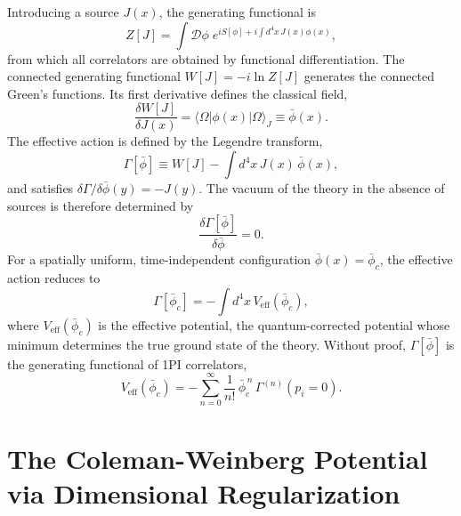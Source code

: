 Introducing a source $J(x)$, the generating functional is
\begin{equation}
	Z[J] = \int\mathcal{D}\phi\;
	e^{iS[\phi] + i\int d^4x\,J(x)\phi(x)},
\end{equation}
from which all correlators are obtained by functional differentiation.
The connected generating functional $W[J] = -i\ln Z[J]$ generates the
connected Green's functions. Its first derivative defines the classical
field,
\begin{equation}
	\frac{\delta W[J]}{\delta J(x)}
	= \langle\Omega|\phi(x)|\Omega\rangle_J
	\equiv \bar\phi(x).
\end{equation}
The effective action is defined by the Legendre transform,
\begin{equation}
	\Gamma[\bar\phi] \equiv W[J]
	- \int d^4x\,J(x)\,\bar\phi(x),
\end{equation}
and satisfies $\delta\Gamma/\delta\bar\phi(y) = -J(y)$. The vacuum of
the theory in the absence of sources is therefore determined by
\begin{equation}
	\frac{\delta\Gamma[\bar\phi]}{\delta\bar\phi} = 0.
\end{equation}
For a spatially uniform, time-independent configuration
$\bar\phi(x) = \bar\phi_c$, the effective action reduces to
\begin{equation}
	\Gamma[\bar\phi_c] = -\int d^4x\,V_{\text{eff}}(\bar\phi_c),
\end{equation}
where $V_{\text{eff}}(\bar\phi_c)$ is the effective potential, the
quantum-corrected potential whose minimum determines the true ground
state of the theory. Without proof, $\Gamma[\bar\phi]$ is the
generating functional of 1PI correlators,
\begin{equation}
	V_{\text{eff}}(\bar\phi_c) = -\sum_{n=0}^{\infty}
	\frac{1}{n!}\,\bar\phi_c^{\,n}\,\Gamma^{(n)}(p_i=0).
\end{equation}

\section{The Coleman-Weinberg Potential via Dimensional Regularization}

